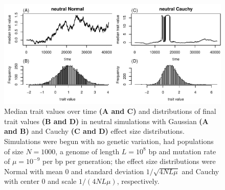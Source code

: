 \documentclass{article}
\newcommand{\1}{\mathbbm{1}}
\theoremstyle{remark}
\theoremstyle{definition}
\begin{document}
\begin{figure}
    \begin{center}
        \includegraphics{sims/neutral_trait_traces}
    \end{center}
    \caption{
        Median trait values over time \textbf{(A and C)}
        and distributions of final trait values \textbf{(B and D)}
        in neutral simulations
        with Gaussian \textbf{(A and B)} and Cauchy \textbf{(C and D)}
        effect size distributions.
        Simulations were begun with no genetic variation,
        had populations of size $N=1000$,
        a genome of length $L=10^8$ bp and mutation rate of $\mu=10^{-9}$ per bp per generation;
        the effect size distributions were
        Normal with mean 0 and standard deviation $1/\sqrt{4NL\mu}$
        and Cauchy with center 0 and scale $1/(4NL\mu)$, respectively.
        \label{fig:trait_distrns}
    }
\end{figure}
\end{document}
